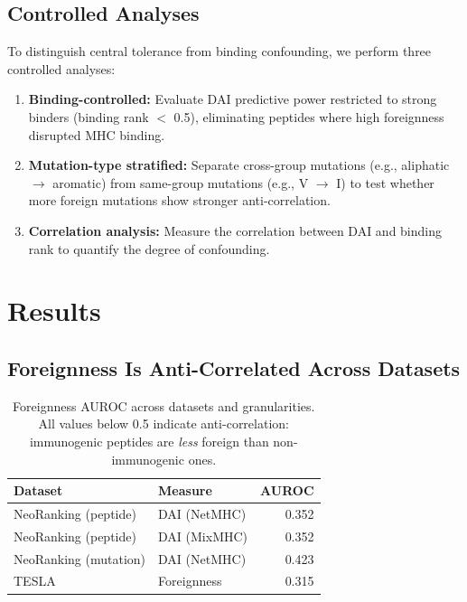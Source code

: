 \documentclass[11pt,twocolumn]{article}
\begin{document}
\subsection{Controlled Analyses}

To distinguish central tolerance from binding confounding, we perform three controlled analyses:

\begin{enumerate}[leftmargin=*,topsep=0pt,itemsep=0pt]
\item \textbf{Binding-controlled:} Evaluate DAI predictive power restricted to strong binders (binding rank $<$ 0.5), eliminating peptides where high foreignness disrupted MHC binding.
\item \textbf{Mutation-type stratified:} Separate cross-group mutations (e.g., aliphatic $\to$ aromatic) from same-group mutations (e.g., V $\to$ I) to test whether more foreign mutations show stronger anti-correlation.
\item \textbf{Correlation analysis:} Measure the correlation between DAI and binding rank to quantify the degree of confounding.
\end{enumerate}

\section{Results}

\subsection{Foreignness Is Anti-Correlated Across Datasets}

\begin{table}[ht]
\centering
\footnotesize
\begin{tabular}{@{}llr@{}}
\toprule
Dataset & Measure & AUROC \\
\midrule
NeoRanking (peptide) & DAI (NetMHC) & 0.352 \\
NeoRanking (peptide) & DAI (MixMHC) & 0.352 \\
NeoRanking (mutation) & DAI (NetMHC) & 0.423 \\
TESLA & Foreignness & 0.315 \\
\bottomrule
\end{tabular}
\caption{Foreignness AUROC across datasets and granularities. All values below 0.5 indicate anti-correlation: immunogenic peptides are \textit{less} foreign than non-immunogenic ones.}
\end{table}
\end{document}
